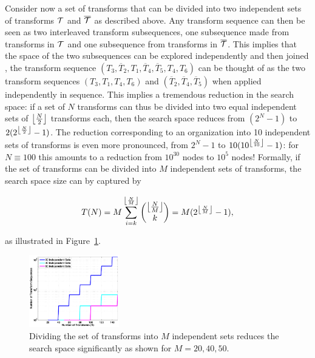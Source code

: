 Consider now a set of transforms that can be divided into two independent sets of transforms ${\cal T}$ and $\overline{\cal T}$ as described above. Any transform sequence can then be seen as two interleaved transform subsequences, one subsequence made from transforms in ${\cal T}$ and one subsequence from transforms in $\overline{\cal T}$. This implies that the space of the two subsequences can be explored independently and then joined \eg, the transform sequence $(T_3,\overline{T}_2,T_1,\overline{T}_4,\overline{T}_5,T_4,T_6)$ can be thought of as the two transform sequences $(T_3,T_1,T_4,T_6)$ and $(\overline{T}_2,\overline{T}_4,\overline{T}_5)$ when applied independently in sequence. This implies a tremendous reduction in the search space: if a set of $N$ transforms can thus be divided into two equal independent sets of $\floor*{\frac{N}{2}}$ transforms each, then the search space reduces from $(2^N-1)$ to $2(2^{\floor*{\frac{N}{2}}}-1)$. The reduction corresponding to an organization into 10 independent sets of transforms is even more pronounced, from $2^N-1$ to $10(10^{\floor*{\frac{N}{10}}}-1)$: for $N \equiv 100$ this amounts to a reduction from $10^{30}$ nodes to $10^5$ nodes! Formally, if the set of transforms can be divided into $M$ independent sets of transforms, the search space size can by captured by 

\begin{equation}
T(N)=M\sum_{i=k}^{\floor*{\frac{N}{M}}}\binom{\floor*{\frac{N}{M}}}{k}=M(2^{\floor*{\frac{N}{M}}}-1),
\label{eq:complexity3}
\end{equation}

\noindent
as illustrated in Figure~\ref{fig:frag_growth_redun}.

\begin{figure}[ht]
\centering
\includegraphics[width=0.35\textwidth]{figs/frag_growth.pdf}
\caption{Dividing the set of transforms into $M$ independent sets reduces the search space significantly as shown for $M=20,40,50$.}
\label{fig:frag_growth_redun} 
\end{figure}

